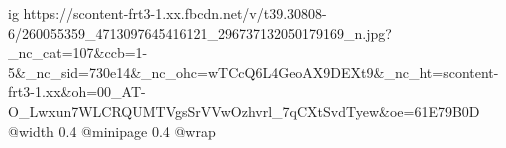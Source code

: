  
 
 
 
 

\ifcmt
  ig https://scontent-frt3-1.xx.fbcdn.net/v/t39.30808-6/260055359_4713097645416121_296737132050179169_n.jpg?_nc_cat=107&ccb=1-5&_nc_sid=730e14&_nc_ohc=wTCcQ6L4GeoAX9DEXt9&_nc_ht=scontent-frt3-1.xx&oh=00_AT-O_Lwxun7WLCRQUMTVgsSrVVwOzhvrl_7qCXtSvdTyew&oe=61E79B0D
  @width 0.4
  @minipage 0.4
  @wrap \parpic[r]
\fi
